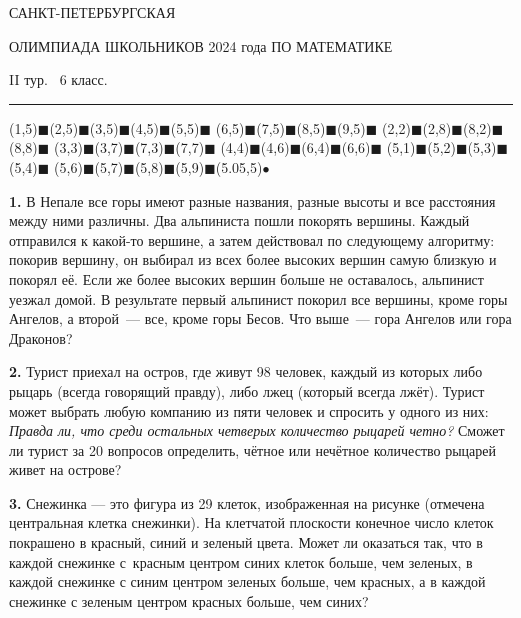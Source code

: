 \documentclass[12pt]{article}
\def\q#1.{{\bf #1. }}
\begin{document}
\centerline{\sc САНКТ-ПЕТЕРБУРГСКАЯ}
\centerline{\sc ОЛИМПИАДА ШКОЛЬНИКОВ 2024 года ПО МАТЕМАТИКЕ}
\centerline{\sc II тур. \ 6 класс.}
\medskip
\hrule
\bigskip

\def\blsq{{\color{lightgray}$\blacksquare$}}

\newbox\kk

\setbox\kk\vbox{\cellsize=8pt
\cput(1,5){\blsq}\cput(2,5){\blsq}\cput(3,5){\blsq}\cput(4,5){\blsq}\cput(5,5){\blsq}
\cput(6,5){\blsq}\cput(7,5){\blsq}\cput(8,5){\blsq}\cput(9,5){\blsq}
\cput(2,2){\blsq}\cput(2,8){\blsq}\cput(8,2){\blsq}\cput(8,8){\blsq}
\cput(3,3){\blsq}\cput(3,7){\blsq}\cput(7,3){\blsq}\cput(7,7){\blsq}
\cput(4,4){\blsq}\cput(4,6){\blsq}\cput(6,4){\blsq}\cput(6,6){\blsq}
\cput(5,1){\blsq}\cput(5,2){\blsq}\cput(5,3){\blsq}\cput(5,4){\blsq}
\cput(5,6){\blsq}\cput(5,7){\blsq}\cput(5,8){\blsq}\cput(5,9){\blsq}\cput(5.05,5){$\bullet$}
\cells{
         _
   _    |_|    _
  |_|_  |_|  _|_|
    |_|_|_|_|_|
 _ _ _|_|_|_|_ _ _
|_|_|_|_|_|_|_|_|_|
     _|_|_|_|_
   _|_| |_| |_|_
  |_|   |_|   |_|
        |_|}}

\q1. В Непале все горы имеют разные названия, разные высоты и все расстояния между ними различны. Два альпиниста пошли покорять вершины. Каждый отправился к какой-то вершине, а затем действовал по следующему алгоритму: покорив вершину, он выбирал из всех более высоких вершин самую близкую и покорял её. Если же более высоких вершин больше не оставалось, альпинист уезжал домой. В результате первый альпинист покорил все вершины, кроме горы Ангелов, а второй~--- все, кроме горы Бесов. Что выше~--- гора Ангелов или гора Драконов?

\q2. Турист приехал на остров, где живут 98 человек, каждый из которых либо рыцарь (всегда говорящий правду), либо лжец (который всегда лжёт). Турист может выбрать любую компанию из пяти человек и спросить у одного из них: \emph{Правда ли, что среди остальных четверых количество рыцарей четно?} Сможет ли турист за 20 вопросов определить, чётное или нечётное количество рыцарей живет на острове?

\setrisbox\copy\kk

\ris
\q3. Снежинка --- это фигура из 29 клеток, изображенная на рисунке (отмечена центральная клетка снежинки). На клетчатой плоскости конечное число клеток покрашено в красный, синий и зеленый цвета. Может ли оказаться так, что в каждой снежинке с~красным центром синих клеток больше, 
чем зеленых, в каждой снежинке с синим центром зеленых больше, чем красных, а в каждой снежинке с зеленым центром красных больше, чем синих? 
\endris
\end{document}
